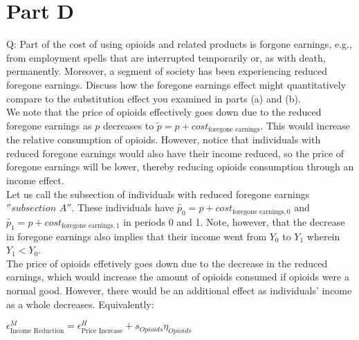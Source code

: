 \documentclass{article}
\begin{document}
\section*{Part D}
Q: Part of the cost of using opioids and related products is forgone earnings, e.g., from employment spells that are interrupted temporarily or, as with death, permanently. Moreover, a segment of society has been experiencing reduced foregone earnings. Discuss how the foregone earnings effect might quantitatively compare to the substitution effect you examined in parts (a) and (b). \\

We note that the price of opioids effectively goes down due to the reduced foregone earnings as $p$ decreases to $\tilde{p} = p + cost_{\text{foregone earnings}}$. This would increase the relative consumption of opioids. However, notice that individuals with reduced foregone earnings would also have their income reduced, so the price of foregone earnings will be lower, thereby reducing opioids consumption through an income effect.\\

Let us call the subsection of individuals with reduced foregone earnings $''subsection$ $A''$. These individuals have $\tilde{p_0} = p + cost_{\text{foregone earnings},0}$ and $\tilde{p_1} = p + cost_{\text{foregone earnings},1}$ in periods 0 and 1. Note, however, that the decrease in foregone earnings also implies that their income went from $Y_0$ to $Y_1$ wherein $Y_1<Y_0$.\\

The price of opioids effetively goes down due to the decrease in the reduced earnings, which would increase the amount of opioids consumed if opioids were a normal good. However, there would be an additional effect as individuals' income as a whole decreases. 
Equivalently:

$\epsilon^{M}_{\text{Income Reduction}} = \epsilon^{H}_{\text{Price Increase}} + s_{Opioids}\eta_{Opioids}$
\end{document}

